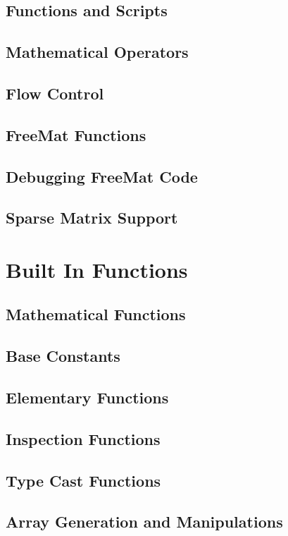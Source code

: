 \documentclass{book}
\begin{document}
\section{Functions and Scripts}

\section{Mathematical Operators}

\section{Flow Control}

\section{FreeMat Functions}

\section{Debugging FreeMat Code}

\section{Sparse Matrix Support}

\chapter{Built In Functions}
\section{Mathematical Functions}

\section{Base Constants}

\section{Elementary Functions}

\section{Inspection Functions}

\section{Type Cast Functions}

\section{Array Generation and Manipulations}

\end{document}
